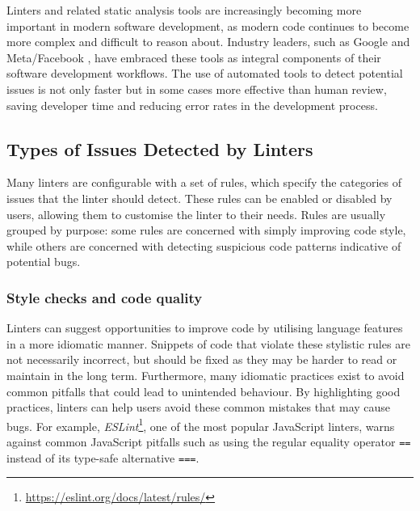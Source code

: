 Linters and related static analysis tools are increasingly becoming more important in modern software development, as modern code continues to become more complex and difficult to reason about.
Industry leaders, such as Google \cite{sadowski_analysis-google_2018} and Meta/Facebook \cite{calcagno_moving-facebook_2015}, have embraced these tools as integral components of their software development workflows.
The use of automated tools to detect potential issues is not only faster but in some cases more effective than human review, saving developer time and reducing error rates in the development process.

\subsection{Types of Issues Detected by Linters}

Many linters are configurable with a set of rules, which specify the categories of issues that the linter should detect.
These rules can be enabled or disabled by users, allowing them to customise the linter to their needs.
Rules are usually grouped by purpose: some rules are concerned with simply improving code style, while others are concerned with detecting suspicious code patterns indicative of potential bugs.

\subsubsection{Style checks and code quality}

Linters can suggest opportunities to improve code by utilising language features in a more idiomatic manner.
Snippets of code that violate these stylistic rules are not necessarily incorrect, but should be fixed as they may be harder to read or maintain in the long term.
Furthermore, many idiomatic practices exist to avoid common pitfalls that could lead to unintended behaviour.
By highlighting good practices, linters can help users avoid these common mistakes that may cause bugs.
For example, \emph{ESLint}\footnote{\url{https://eslint.org/docs/latest/rules/}}, one of the most popular JavaScript linters, warns against common JavaScript pitfalls such as using the regular equality operator \texttt{==} instead of its type-safe alternative \texttt{===}.


